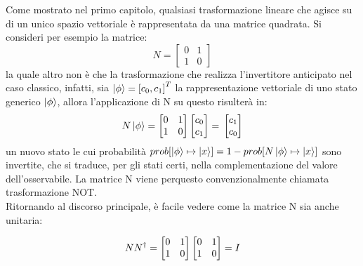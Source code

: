 \documentclass[12pt,a4paper,openright]{report}
\begin{document}
Come mostrato nel primo capitolo, qualsiasi trasformazione lineare che agisce su di un unico spazio vettoriale è rappresentata da una matrice quadrata. Si consideri per esempio la matrice:
\[
   N = \begin{bmatrix}
        0 & 1 \\
        1 & 0
    \end{bmatrix}
\]
la quale altro non è che la trasformazione che realizza l'invertitore anticipato nel caso classico, infatti, sia $\ket{\phi} = {[c_0, c_1]}^T$ 
la rappresentazione vettoriale di uno stato generico $\ket{\phi}$, allora l'applicazione di N su questo risulterà in: 
\[
    N\ket{\phi}=
    \begin{bmatrix}
        0 & 1 \\
        1 & 0
    \end{bmatrix}
    \begin{bmatrix}
        c_0 \\ c_1
    \end{bmatrix}=\\
    \begin{bmatrix}
        c_1 \\
        c_0
    \end{bmatrix}
\]
un nuovo stato le cui probabilità $prob[\ket{\phi} \mapsto \ket{x}] = 1 - prob[N\ket{\phi} \mapsto \ket{x}]$ sono invertite,
che si traduce, per gli stati certi, nella complementazione del valore dell'osservabile. La matrice N viene perquesto convenzionalmente chiamata trasformazione NOT.\\
Ritornando al discorso principale, è facile vedere come la matrice N sia anche unitaria:

\[
    NN^{\dag} = 
    \begin{bmatrix}
        0 & 1 \\
        1 & 0
    \end{bmatrix}
    \begin{bmatrix}
        0 & 1 \\
        1 & 0
    \end{bmatrix}=\\
    I
\]
\par
\end{document}
